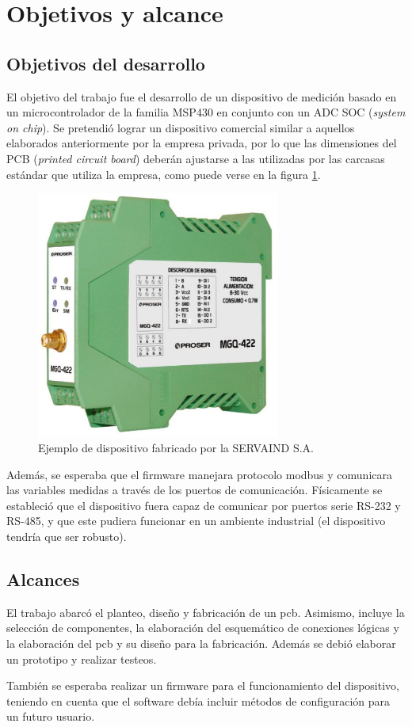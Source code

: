 \section{Objetivos y alcance}

\subsection{Objetivos del desarrollo}

El objetivo del trabajo fue el desarrollo de un dispositivo de medición basado en un microcontrolador de la familia MSP430 en conjunto con un ADC SOC (\textit{system on chip}). Se pretendió lograr un dispositivo comercial similar a aquellos elaborados anteriormente por la empresa privada, por lo que las dimensiones del PCB (\textit{printed circuit board}) deberán ajustarse a las utilizadas por las carcasas estándar que utiliza la empresa, como puede verse en la figura \ref{fig:disp_emp}.

\begin{figure}[!h]
	\centering
	\includegraphics[width=80mm,keepaspectratio]{Figures/dispositivo_empresa.png}
	\caption{Ejemplo de dispositivo fabricado por la SERVAIND S.A.}
	\label{fig:disp_emp}
\end{figure}

Además, se esperaba que el firmware manejara protocolo modbus y comunicara las variables medidas a través de los puertos de comunicación. Físicamente se estableció que el dispositivo fuera capaz de comunicar por puertos serie RS-232 y RS-485, y que este pudiera funcionar en un ambiente industrial (el dispositivo tendría que ser robusto).


\subsection{Alcances}



El trabajo abarcó el planteo, diseño y fabricación de un pcb. Asimismo, incluye la selección de componentes, la elaboración del esquemático de conexiones lógicas y la elaboración del pcb y su diseño para la fabricación. Además se debió elaborar un prototipo y realizar testeos.

También se esperaba realizar un firmware para el funcionamiento del dispositivo, teniendo en cuenta que el software debía incluir métodos de configuración para un futuro usuario.
